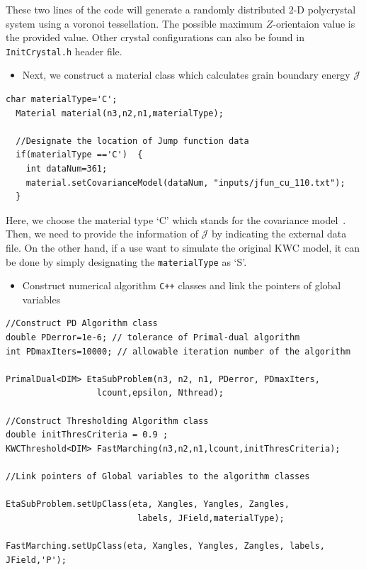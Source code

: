 \documentclass[11pt]{article}
\begin{document}
These two lines of the code will generate a randomly distributed 2-D polycrystal system
using a voronoi tessellation.
The possible maximum $Z$-orientaion value is the provided value.
Other crystal configurations can also be found in \texttt{InitCrystal.h} header file.


\begin{itemize} \item Next, we construct a material class 
which calculates grain boundary energy $\mathcal{J}$ \end{itemize}
 
\begin{tcolorbox}
\begin{lstlisting}[basicstyle=\footnotesize]
  char materialType='C';
  Material material(n3,n2,n1,materialType);

  //Designate the location of Jump function data
  if(materialType =='C')  {
    int dataNum=361;
    material.setCovarianceModel(dataNum, "inputs/jfun_cu_110.txt");
  }
\end{lstlisting}
\end{tcolorbox}
Here, we choose the material type `C' which stands 
for the covariance model~\cite{Runnels:2016_1,Runnels:2016_2}.
Then, we need to provide the information of $\mathcal{J}$ by
indicating the external data file.
On the other hand, if a use want to simulate the original KWC model, 
it can be done by simply designating the \texttt{materialType} as `S'.

\begin{itemize} \item Construct numerical algorithm \texttt{C++} classes
and link the pointers of global variables \end{itemize}

\begin{tcolorbox}
\begin{lstlisting}[basicstyle=\footnotesize]
//Construct PD Algorithm class
double PDerror=1e-6; // tolerance of Primal-dual algorithm
int PDmaxIters=10000; // allowable iteration number of the algorithm

PrimalDual<DIM> EtaSubProblem(n3, n2, n1, PDerror, PDmaxIters,
		          lcount,epsilon, Nthread);

//Construct Thresholding Algorithm class		          
double initThresCriteria = 0.9 ;
KWCThreshold<DIM> FastMarching(n3,n2,n1,lcount,initThresCriteria);
  
//Link pointers of Global variables to the algorithm classes

EtaSubProblem.setUpClass(eta, Xangles, Yangles, Zangles,
                          labels, JField,materialType);

FastMarching.setUpClass(eta, Xangles, Yangles, Zangles, labels, JField,'P');
    
\end{lstlisting}
\end{tcolorbox}
\end{document}
